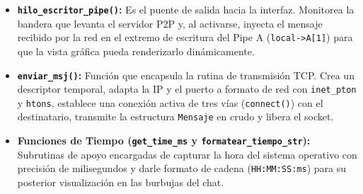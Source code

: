 \begin{itemize}
    \item \textbf{\texttt{hilo\_escritor\_pipe()}:} Es el puente de salida hacia la interfaz. Monitorea la bandera que levanta el servidor P2P y, al activarse, inyecta el mensaje recibido por la red en el extremo de escritura del Pipe A (\texttt{local->A[1]}) para que la vista gráfica pueda renderizarlo dinámicamente.
    
    \item \textbf{\texttt{enviar\_msj()}:} Función que encapsula la rutina de transmisión TCP. Crea un descriptor temporal, adapta la IP y el puerto a formato de red con \texttt{inet\_pton} y \texttt{htons}, establece una conexión activa de tres vías (\texttt{connect()}) con el destinatario, transmite la estructura \texttt{Mensaje} en crudo y libera el socket.
    
    \item \textbf{Funciones de Tiempo (\texttt{get\_time\_ms} y \texttt{formatear\_tiempo\_str}):} Subrutinas de apoyo encargadas de capturar la hora del sistema operativo con precisión de milisegundos y darle formato de cadena (\texttt{HH:MM:SS:ms}) para su posterior visualización en las burbujas del chat.
\end{itemize}

